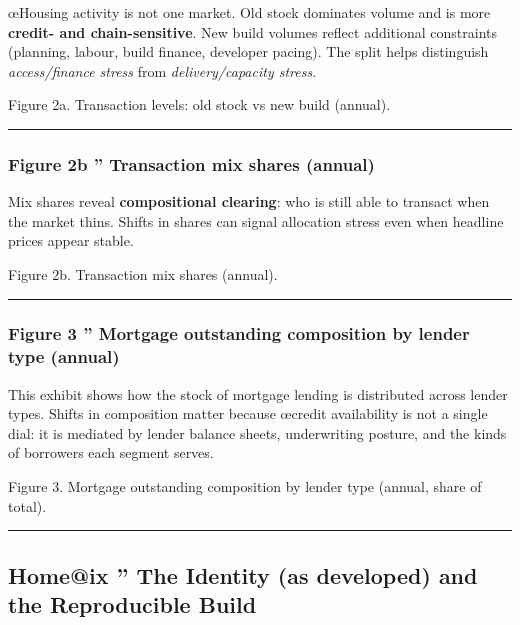 \documentclass[
]{article}
\begin{document}
œHousing activity is not one market. Old stock dominates volume and is
more \textbf{credit- and chain-sensitive}. New build volumes reflect
additional constraints (planning, labour, build finance, developer
pacing). The split helps distinguish \emph{access/finance stress} from
\emph{delivery/capacity stress}.

Figure 2a. Transaction levels: old stock vs new build (annual).

\begin{center}\rule{0.5\linewidth}{0.5pt}\end{center}

\protect{}\label{part1-fig2b}
\subsubsection{Figure 2b '' Transaction mix shares
(annual)}\label{figure-2b-transaction-mix-shares-annual}

Mix shares reveal \textbf{compositional clearing}: who is still able to
transact when the market thins. Shifts in shares can signal allocation
stress even when headline prices appear stable.

Figure 2b. Transaction mix shares (annual).

\begin{center}\rule{0.5\linewidth}{0.5pt}\end{center}

\protect{}\label{part1-fig3}
\subsubsection{Figure 3 '' Mortgage outstanding composition by lender
type
(annual)}\label{figure-3-mortgage-outstanding-composition-by-lender-type-annual}

This exhibit shows how the stock of mortgage lending is distributed
across lender types. Shifts in composition matter because œcredit
availability is not a single dial: it is mediated by lender balance
sheets, underwriting posture, and the kinds of borrowers each segment
serves.

Figure 3. Mortgage outstanding composition by lender type (annual, share
of total).

\begin{center}\rule{0.5\linewidth}{0.5pt}\end{center}

\protect{}\label{homeix-identity}
\subsection{Home@ix '' The Identity (as developed) and the Reproducible
Build}\label{homeix-the-identity-as-developed-and-the-reproducible-build}
\end{document}
